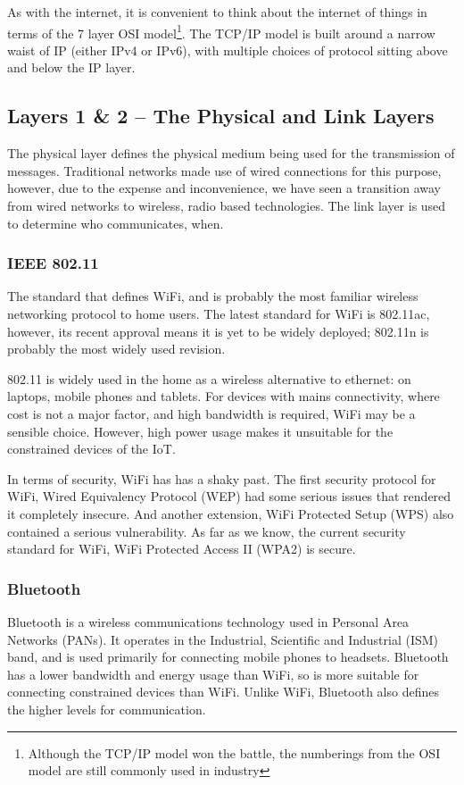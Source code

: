 \documentclass[10pt,journal,compsoc]{IEEEtran}
\begin{document}
As with the internet, it is convenient to think about the internet of things in
terms of the 7 layer OSI model\footnote{Although the TCP/IP model won the
battle, the numberings from the OSI model are still commonly used in industry}.
The TCP/IP model is built around a narrow waist of IP (either IPv4 or IPv6),
with multiple choices of protocol sitting above and below the IP layer. 

\subsection{Layers 1 \& 2 -- The Physical and Link Layers}
\label{layer_1_2}
The physical layer defines the physical medium being used for the transmission
of messages. Traditional networks made use of wired connections for this
purpose, however, due to the expense and inconvenience, we have seen a
transition away from wired networks to wireless, radio based technologies. The
link layer is used to determine who communicates, when.

\subsubsection{IEEE 802.11}
The standard that defines WiFi, and is probably the most
familiar wireless networking protocol to home users. The latest standard for
WiFi is 802.11ac, however, its recent approval means it is yet to be widely
deployed; 802.11n is probably the most widely used revision. 

802.11 is widely used in the home as a wireless alternative to ethernet: on
laptops, mobile phones and tablets. For devices with mains connectivity, where
cost is not a major factor, and high bandwidth is required, WiFi may be a
sensible choice.  However, high power usage makes it unsuitable for the
constrained devices of the IoT. 

In terms of security, WiFi has has a shaky past. The first security protocol
for WiFi, Wired Equivalency Protocol (WEP) had some serious issues that
rendered it completely insecure. And another extension, WiFi Protected
Setup (WPS) also contained a serious vulnerability. As far as we know, the
current security standard for WiFi, WiFi Protected Access II (WPA2) is
secure. 

\subsubsection{Bluetooth}
Bluetooth is a wireless communications technology used in Personal Area Networks (PANs).
It operates in the Industrial, Scientific and Industrial (ISM) band, and is
used primarily for connecting mobile phones to headsets. Bluetooth has a lower
bandwidth and energy usage than WiFi, so is more suitable for connecting
constrained devices than WiFi. Unlike WiFi, Bluetooth also defines the higher
levels for communication. 
\end{document}
